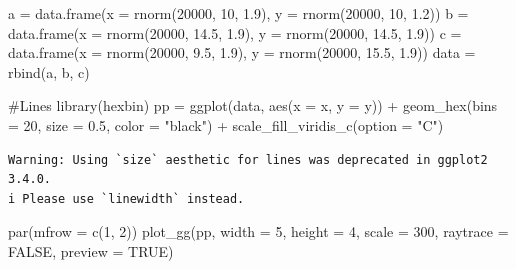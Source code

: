 \documentclass[
  letterpaper,
  DIV=11,
  numbers=noendperiod]{scrreprt}
\newenvironment{Shaded}{\begin{snugshade}}{\end{snugshade}}
\newcommand{\AttributeTok}[1]{\textcolor[rgb]{0.40,0.45,0.13}{#1}}
\newcommand{\CommentTok}[1]{\textcolor[rgb]{0.37,0.37,0.37}{#1}}
\newcommand{\ConstantTok}[1]{\textcolor[rgb]{0.56,0.35,0.01}{#1}}
\newcommand{\DecValTok}[1]{\textcolor[rgb]{0.68,0.00,0.00}{#1}}
\newcommand{\FloatTok}[1]{\textcolor[rgb]{0.68,0.00,0.00}{#1}}
\newcommand{\FunctionTok}[1]{\textcolor[rgb]{0.28,0.35,0.67}{#1}}
\newcommand{\NormalTok}[1]{\textcolor[rgb]{0.00,0.23,0.31}{#1}}
\newcommand{\OtherTok}[1]{\textcolor[rgb]{0.00,0.23,0.31}{#1}}
\newcommand{\SpecialCharTok}[1]{\textcolor[rgb]{0.37,0.37,0.37}{#1}}
\newcommand{\StringTok}[1]{\textcolor[rgb]{0.13,0.47,0.30}{#1}}
\begin{document}
\begin{Shaded}
\begin{Highlighting}[]
\NormalTok{a }\OtherTok{=} \FunctionTok{data.frame}\NormalTok{(}\AttributeTok{x =} \FunctionTok{rnorm}\NormalTok{(}\DecValTok{20000}\NormalTok{, }\DecValTok{10}\NormalTok{, }\FloatTok{1.9}\NormalTok{), }\AttributeTok{y =} \FunctionTok{rnorm}\NormalTok{(}\DecValTok{20000}\NormalTok{, }\DecValTok{10}\NormalTok{, }\FloatTok{1.2}\NormalTok{))}
\NormalTok{b }\OtherTok{=} \FunctionTok{data.frame}\NormalTok{(}\AttributeTok{x =} \FunctionTok{rnorm}\NormalTok{(}\DecValTok{20000}\NormalTok{, }\FloatTok{14.5}\NormalTok{, }\FloatTok{1.9}\NormalTok{), }\AttributeTok{y =} \FunctionTok{rnorm}\NormalTok{(}\DecValTok{20000}\NormalTok{, }\FloatTok{14.5}\NormalTok{, }\FloatTok{1.9}\NormalTok{))}
\NormalTok{c }\OtherTok{=} \FunctionTok{data.frame}\NormalTok{(}\AttributeTok{x =} \FunctionTok{rnorm}\NormalTok{(}\DecValTok{20000}\NormalTok{, }\FloatTok{9.5}\NormalTok{, }\FloatTok{1.9}\NormalTok{), }\AttributeTok{y =} \FunctionTok{rnorm}\NormalTok{(}\DecValTok{20000}\NormalTok{, }\FloatTok{15.5}\NormalTok{, }\FloatTok{1.9}\NormalTok{))}
\NormalTok{data }\OtherTok{=} \FunctionTok{rbind}\NormalTok{(a, b, c)}

\CommentTok{\#Lines}
\FunctionTok{library}\NormalTok{(hexbin)}
\NormalTok{pp }\OtherTok{=} \FunctionTok{ggplot}\NormalTok{(data, }\FunctionTok{aes}\NormalTok{(}\AttributeTok{x =}\NormalTok{ x, }\AttributeTok{y =}\NormalTok{ y)) }\SpecialCharTok{+}
  \FunctionTok{geom\_hex}\NormalTok{(}\AttributeTok{bins =} \DecValTok{20}\NormalTok{, }\AttributeTok{size =} \FloatTok{0.5}\NormalTok{, }\AttributeTok{color =} \StringTok{"black"}\NormalTok{) }\SpecialCharTok{+}
  \FunctionTok{scale\_fill\_viridis\_c}\NormalTok{(}\AttributeTok{option =} \StringTok{"C"}\NormalTok{)}
\end{Highlighting}
\end{Shaded}

\begin{verbatim}
Warning: Using `size` aesthetic for lines was deprecated in ggplot2 3.4.0.
i Please use `linewidth` instead.
\end{verbatim}

\begin{Shaded}
\begin{Highlighting}[]
\FunctionTok{par}\NormalTok{(}\AttributeTok{mfrow =} \FunctionTok{c}\NormalTok{(}\DecValTok{1}\NormalTok{, }\DecValTok{2}\NormalTok{))}
\FunctionTok{plot\_gg}\NormalTok{(pp, }\AttributeTok{width =} \DecValTok{5}\NormalTok{, }\AttributeTok{height =} \DecValTok{4}\NormalTok{, }\AttributeTok{scale =} \DecValTok{300}\NormalTok{, }\AttributeTok{raytrace =} \ConstantTok{FALSE}\NormalTok{, }\AttributeTok{preview =} \ConstantTok{TRUE}\NormalTok{)}
\end{Highlighting}
\end{Shaded}
\end{document}
